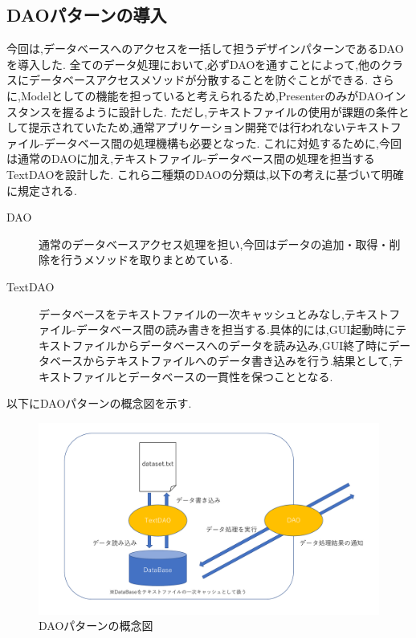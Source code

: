 \documentclass[uplatex,12pt]{jsarticle}
\begin{document}
\subsection{DAOパターンの導入}
今回は,データベースへのアクセスを一括して担うデザインパターンであるDAOを導入した.
全てのデータ処理において,必ずDAOを通すことによって,他のクラスにデータベースアクセスメソッドが分散することを防ぐことができる.
さらに,Modelとしての機能を担っていると考えられるため,PresenterのみがDAOインスタンスを握るように設計した.
ただし,テキストファイルの使用が課題の条件として提示されていたため,通常アプリケーション開発では行われないテキストファイル-データベース間の処理機構も必要となった.
これに対処するために,今回は通常のDAOに加え,テキストファイル-データベース間の処理を担当するTextDAOを設計した.
これら二種類のDAOの分類は,以下の考えに基づいて明確に規定される.
\begin{description}
\item[DAO] 通常のデータベースアクセス処理を担い,今回はデータの追加・取得・削除を行うメソッドを取りまとめている.
\item[TextDAO] データベースをテキストファイルの一次キャッシュとみなし,テキストファイル-データベース間の読み書きを担当する.具体的には,GUI起動時にテキストファイルからデータベースへのデータを読み込み,GUI終了時にデータベースからテキストファイルへのデータ書き込みを行う.結果として,テキストファイルとデータベースの一貫性を保つこととなる.
\end{description}
以下にDAOパターンの概念図を示す. \\
\begin{figure}[!hbt]
    \centering
    \includegraphics[scale=0.35]{images/dao_pattern.pdf}
    \caption{DAOパターンの概念図}
\end{figure}
\end{document}
